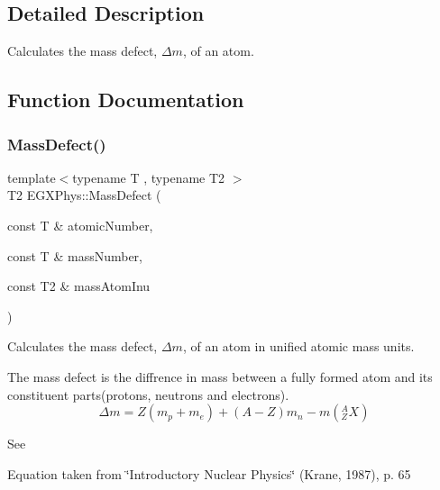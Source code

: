 \subsection{Detailed Description}
Calculates the mass defect, $\Delta m$, of an atom. 

\subsection{Function Documentation}
\mbox{\label{group___e_g_x_phys-_mass_defect_gae89f2dfa65992c0314adc2440b2f582a}} 
\subsubsection{\texorpdfstring{Mass\+Defect()}{MassDefect()}}
{\footnotesize\ttfamily template$<$typename T , typename T2 $>$ \\
T2 E\+G\+X\+Phys\+::\+Mass\+Defect (\begin{DoxyParamCaption}\item[{const T \&}]{atomic\+Number,  }\item[{const T \&}]{mass\+Number,  }\item[{const T2 \&}]{mass\+Atom\+Inu }\end{DoxyParamCaption})}



Calculates the mass defect, $\Delta m$, of an atom in unified atomic mass units. 

The mass defect is the diffrence in mass between a fully formed atom and its constituent parts(protons, neutrons and electrons). \[\Delta m = Z(m_p + m_e)+(A-Z)m_n - m({^A_ZX})\]

See

Equation taken from \char`\"{}\+Introductory Nuclear Physics\char`\"{} (Krane, 1987), p. 65


